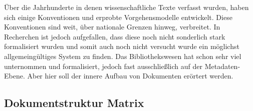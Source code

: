 Über die Jahrhunderte in denen wissenschaftliche Texte verfasst wurden, haben sich einige Konventionen und erprobte Vorgehensmodelle entwickelt. Diese Konventionen sind weit, über nationale Grenzen hinweg, verbreitet. In Recherchen ist jedoch aufgefallen, dass diese noch nicht sonderlich stark formalisiert wurden und somit auch noch nicht versucht wurde ein möglichst allgemeingültiges System zu finden. Das Bibliothekswesen hat schon sehr viel unternommen und formalisiert, jedoch fast ausschließlich auf der Metadaten-Ebene. Aber hier soll der innere Aufbau von Dokumenten erörtert werden.

 
\subsection{Dokumentstruktur Matrix}\label{}
 

 